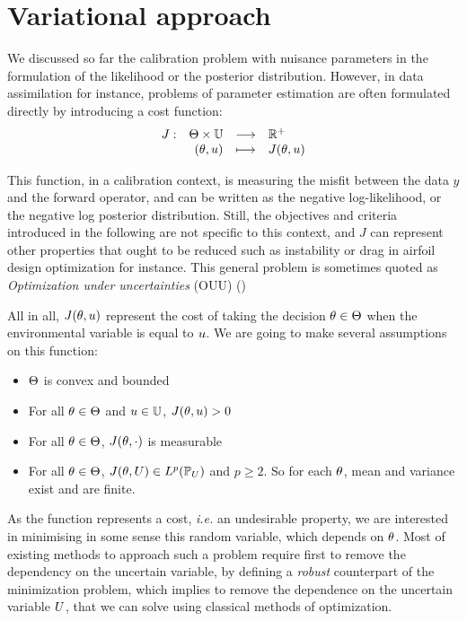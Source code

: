 \documentclass[../../Main_ManuscritThese.tex]{subfiles}
\begin{document}
\clearpage
\section{Variational approach}
\label{sec:J_rv}
We discussed so far the calibration problem with nuisance parameters
in the formulation of the likelihood or the posterior
distribution. However, in data assimilation for instance, problems of
parameter estimation are often formulated directly by introducing a
cost function:
\begin{equation}
  \begin{array}{rrcl}
    J: &\Theta \times \mathbb{U} &\longrightarrow& \mathbb{R}^+ \\
    &(\theta, u) &\longmapsto &J(\theta, u)
    \end{array}
  \end{equation}
  
  This function, in a calibration context, is measuring the misfit
  between the data $y$ and the forward operator, and can be written as
  the negative log-likelihood, or the negative log posterior
  distribution. Still, the objectives and criteria introduced in the
  following are not specific to this context, and $J$ can represent
  other properties that ought to be reduced such as instability or
  drag in airfoil design optimization for instance. This general
  problem is sometimes quoted as \emph{Optimization under
    uncertainties} (OUU)
  (\cite{cook_effective_2018,seshadri_density-matching_2014})


All in all, $J(\theta, u)$ represent the cost of taking the decision $\theta\in\Theta$ when the environmental variable is equal to $u$.
We are going to make several assumptions on this function:
\begin{itemize}
\item $\Theta$ is convex and bounded 
\item For all $\theta \in \Theta$ and $u \in \mathbb{U}$, $J(\theta, u)>0$
\item For all $\theta \in \Theta$, $J(\theta, \cdot)$ is measurable
\item For all $\theta \in \Theta$, $J(\theta, U) \in L^p(\mathbb{P}_{U})$ and $p \geq 2$. So for each $\theta$, mean and variance exist and are finite.
\end{itemize}

As the function represents a cost, \emph{i.e.} an undesirable
property, we are interested in minimising in some sense this random
variable, which depends on $\theta$.  Most of existing methods to
approach such a problem require first to remove the dependency on the
uncertain variable, by defining a \emph{robust} counterpart of the
minimization problem, which implies to remove the dependence on the
uncertain variable $U$, that we can solve using classical methods of
optimization.
\end{document}
